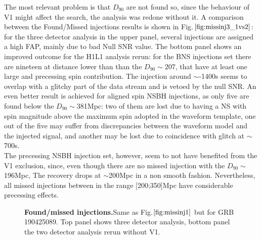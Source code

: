\documentclass[binding=0.6cm, LaM]{sapthesis}
\begin{document}
	The most relevant problem is that $D_90$ are not found so, 	
	since the behaviour of V1 might affect the search, 	
	the analysis was redone without it.
	A comparison between the Found/Missed injections results is shown in Fig.$\ref{fig:missinj3_1vs2}$:
	for the three detector analysis in the upper panel, several injections are assigned a high FAP, 
	mainly due to bad Null SNR value.
	The bottom panel shows an improved outcome for the H1L1 analysis rerun: 
	for the BNS injections set there are nineteen at distance lower than than the $D_{90}\sim207$, 
	that have at least one large and precessing spin contribution. 
	The injection around $\sim$-1400s seems to overlap with a glitchy part of the data stream and is vetoed by the null SNR.
	An even better result is achieved for aligned spin NSBH injections, 
	as only five are found below the $D_{90}\sim$381Mpc:
	two of them are lost due to having a NS with spin magnitude above the maximum spin adopted in the waveform template,
	one out of the five may suffer from discrepancies between the waveform model and the injected signal,
	and another may be lost due to coincidence with glitch at $\sim$700s. \\
	The precessing NSBH injection set, however, seem to not have benefited from the V1 exclusion,
	since, even though there are no missed injection with the $D_{90}\sim$196Mpc,
	The recovery drops at $\sim$200Mpc in a non smooth fashion.
 	Nevertheless, all missed injections between in the range [200;350]Mpc have considerable precessing effects. 
                \begin{figure}[h]
                        \noindent
                        \label{missinj3_1vs2}
                        \centering
                        \caption{\textbf{Found/missed injections.}Same as Fig.$\ref{fig:missinj1}$ but for GRB 190425089. Top panel shows three detector analysis, bottom panel the two detector analysis rerun without V1.}
                        \label{fig:missinj3_1vs2}
                \end{figure}
\end{document}
